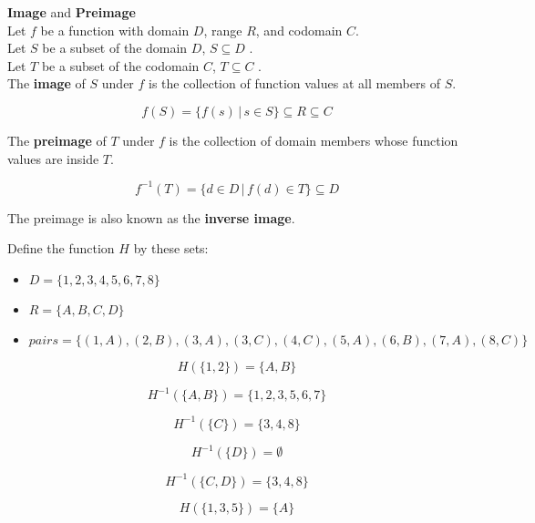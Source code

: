 \documentclass{ximera}
\begin{document}
\begin{definition} \textbf{\textcolor{green!50!black}{Image}} and \textbf{\textcolor{green!50!black}{Preimage}} \\


Let $f$ be a function with domain $D$, range $R$, and codomain $C$. \\
Let $S$ be a subset of the domain $D$, $S \subseteq D$ . \\
Let $T$ be a subset of the codomain $C$, $T \subseteq C$ . \\


The \textbf{image} of $S$ under $f$ is the collection of function values at all members of $S$.

\[
f(S) = \{ f(s) \, | \, s \in S   \} \subseteq R \subseteq C
\]




The \textbf{preimage} of $T$ under $f$ is the collection of domain members whose function values are inside $T$.

\[
f^{-1}(T) = \{ d \in D \, | \, f(d) \in T  \} \subseteq D
\]


The preimage is also known as the \textbf{inverse image}.



\end{definition}









\begin{example}


Define the function $H$ by these sets: \\

\begin{itemize}
	\item  $D = \{ 1, 2, 3, 4, 5, 6, 7, 8 \}$
	\item  $R = \{ A, B, C, D \}$
	\item  $pairs = \{ (1, A), (2, B), (3, A), (3, C), (4, C), (5, A), (6, B), (7, A), (8, C)    \}$
\end{itemize}


\[  H(\{ 1, 2 \}) = \{ A, B \}  \]

\[  H^{-1}(\{ A, B \}) = \{ 1, 2, 3, 5, 6, 7 \}  \]

\[  H^{-1}(\{ C \}) = \{ 3, 4, 8 \}  \]

\[  H^{-1}(\{ D \}) = \emptyset  \]

\[  H^{-1}(\{ C, D \}) = \{ 3, 4, 8 \}  \]

\[  H(\{ 1, 3, 5 \}) = \{ A \}  \]


\end{example}
\end{document}
